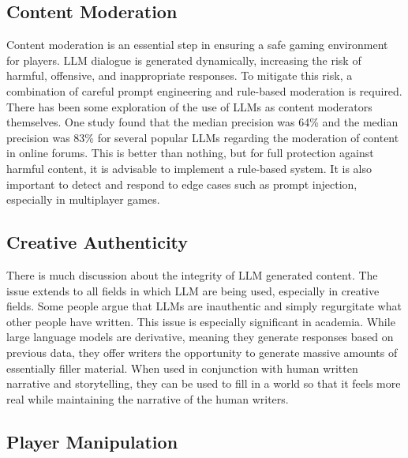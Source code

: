 \documentclass[10pt,twocolumn]{article}
\begin{document}
    \subsection{Content Moderation}

        \par 
        Content moderation is an essential step in ensuring a safe gaming environment for players. LLM dialogue is generated dynamically, increasing the risk of harmful, offensive, and inappropriate responses. To mitigate this risk, a combination of careful prompt engineering and rule-based moderation is required. There has been some exploration of the use of LLMs as content moderators themselves. One study found that the median precision was 64\% and the median precision was 83\% for several popular LLMs regarding the moderation of content in online forums\cite{content_moderation}. This is better than nothing, but for full protection against harmful content, it is advisable to implement a rule-based system. It is also important to detect and respond to edge cases such as prompt injection, especially in multiplayer games. 

    \subsection{Creative Authenticity}

        \par 
        There is much discussion about the integrity of LLM generated content. The issue extends to all fields in which LLM are being used, especially in creative fields. Some people argue that LLMs are inauthentic and simply regurgitate what other people have written. This issue is especially significant in academia\cite{academic_integrity}\cite{academic_integrity2}. While large language models are derivative, meaning they generate responses based on previous data, they offer writers the opportunity to generate massive amounts of essentially filler material. When used in conjunction with human written narrative and storytelling, they can be used to fill in a world so that it feels more real while maintaining the narrative of the human writers. 
        
    \subsection{Player Manipulation}
\end{document}
